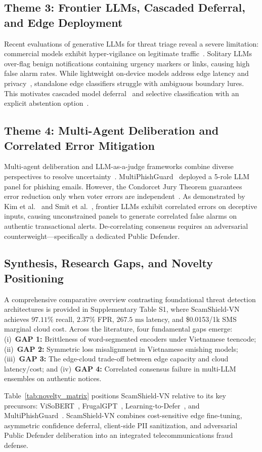 \subsection{Theme 3: Frontier LLMs, Cascaded Deferral, and Edge Deployment}
Recent evaluations of generative LLMs for threat triage reveal a severe limitation: commercial models exhibit hyper-vigilance on legitimate traffic~\cite{zhou2026fraudsmswalker}. Solitary LLMs over-flag benign notifications containing urgency markers or links, causing high false alarm rates. While lightweight on-device models address edge latency and privacy~\cite{banda2026quishingshield, phap2026edgeai}, standalone edge classifiers struggle with ambiguous boundary lures. This motivates cascaded model deferral~\cite{chen2023frugalgpt, mozannar2020consistent} and selective classification with an explicit abstention option~\cite{chow1970optimum}.

\subsection{Theme 4: Multi-Agent Deliberation and Correlated Error Mitigation}
Multi-agent deliberation and LLM-as-a-judge frameworks combine diverse perspectives to resolve uncertainty~\cite{chan2024chateval, du2024improving, verga2024poll}. MultiPhishGuard~\cite{chen2025multiphishguard} deployed a 5-role LLM panel for phishing emails. However, the Condorcet Jury Theorem guarantees error reduction only when voter errors are independent~\cite{ladha1992condorcet}. As demonstrated by Kim et al.~\cite{kim2025correlated} and Smit et al.~\cite{smit2024should}, frontier LLMs exhibit correlated errors on deceptive inputs, causing unconstrained panels to generate correlated false alarms on authentic transactional alerts. De-correlating consensus requires an adversarial counterweight---specifically a dedicated Public Defender.

\subsection{Synthesis, Research Gaps, and Novelty Positioning}
\label{subsec:gaps}
A comprehensive comparative overview contrasting foundational threat detection architectures is provided in Supplementary Table S1, where ScamShield-VN achieves $97.11\%$ recall, $2.37\%$ FPR, $267.5\text{ ms}$ latency, and \$0.0153/1k SMS marginal cloud cost. Across the literature, four fundamental gaps emerge: (i)~\textbf{GAP 1:} Brittleness of word-segmented encoders under Vietnamese teencode; (ii)~\textbf{GAP 2:} Symmetric loss misalignment in Vietnamese smishing models; (iii)~\textbf{GAP 3:} The edge-cloud trade-off between edge capacity and cloud latency/cost; and (iv)~\textbf{GAP 4:} Correlated consensus failure in multi-LLM ensembles on authentic notices.

Table~\ref{tab:novelty_matrix} positions ScamShield-VN relative to its key precursors: ViSoBERT~\cite{nguyen2023visobert}, FrugalGPT~\cite{chen2023frugalgpt}, Learning-to-Defer~\cite{mozannar2020consistent}, and MultiPhishGuard~\cite{chen2025multiphishguard}. ScamShield-VN combines cost-sensitive edge fine-tuning, asymmetric confidence deferral, client-side PII sanitization, and adversarial Public Defender deliberation into an integrated telecommunications fraud defense.
